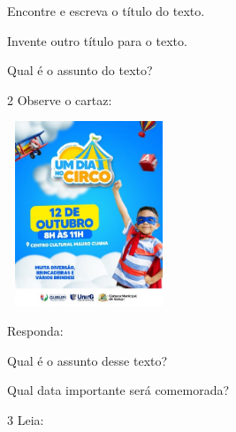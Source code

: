 \begin{escolha}
\item Encontre e escreva o título do texto.


\item Invente outro título para o texto.


\item Qual é o assunto do texto?

\end{escolha}

\num{2} Observe o cartaz:


\includegraphics[width=1.92500in,height=2.18056in]{media/image119.jpeg}


Responda:

\begin{escolha}
\item Qual é o assunto desse texto?


\item Qual data importante será comemorada?

\end{escolha}

\num{3} Leia:


